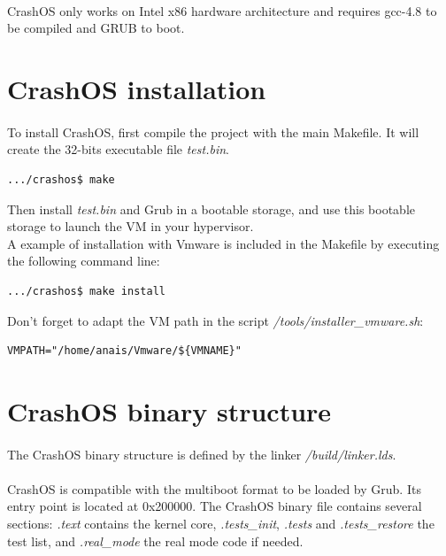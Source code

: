 \documentclass[12pt, openany]{report}
\begin{document}
\paragraph{}CrashOS only works on Intel x86 hardware architecture and requires gcc-4.8 to be compiled and GRUB to boot.

\section*{CrashOS installation}

\paragraph{}To install CrashOS, first compile the project with the main Makefile. It will create the 32-bits executable file \emph{test.bin}. 
\begin{lstlisting}
.../crashos$ make
\end{lstlisting}
Then install \emph{test.bin} and Grub in a bootable storage, and use this bootable storage to launch the VM in your hypervisor.
\\A example of installation with Vmware is included in the Makefile by executing the following command line:
\begin{lstlisting}
.../crashos$ make install
\end{lstlisting}
Don't forget to adapt the VM path in the script \emph{/tools/installer\_vmware.sh}:
\begin{lstlisting}
VMPATH="/home/anais/Vmware/${VMNAME}"
\end{lstlisting}

\section*{CrashOS binary structure}
\paragraph{}The CrashOS binary structure is defined by the linker \emph{/build/linker.lds}.
\paragraph{}CrashOS is compatible with the multiboot format to be loaded by Grub. Its entry point is located at 0x200000. The CrashOS binary file contains several sections: \emph{.text} contains the kernel core, \emph{.tests\_init}, \emph{.tests} and \emph{.tests\_restore} the test list, and \emph{.real\_mode} the real mode code if needed.
\end{document}
